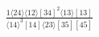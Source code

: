\documentclass[varwidth, border=5pt]{standalone}
\begin{document}
\begin{my}
$\begin{gathered}
\scriptscriptstyle\frac{1⟨24⟩⟨12⟩[34]^2⟨13⟩[13]}{⟨14⟩^3[14]⟨23⟩[35][45]}
\end{gathered}$
\end{my}
\end{document}
